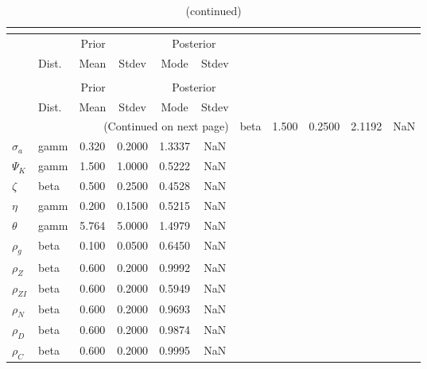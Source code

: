  
\begin{center}
\begin{longtable}{llcccc} 
\caption{Results from posterior maximization (parameters)}\\
 \label{Table:Posterior:1}\\
\toprule 
  & \multicolumn{3}{c}{Prior}  &  \multicolumn{2}{c}{Posterior} \\
  \cmidrule(r{.75em}){2-4} \cmidrule(r{.75em}){5-6}
  & Dist. & Mean  & Stdev & Mode & Stdev \\ 
\midrule \endfirsthead 
\caption{(continued)}\\
 \bottomrule 
  & \multicolumn{3}{c}{Prior}  &  \multicolumn{2}{c}{Posterior} \\
  \cmidrule(r{.75em}){2-4} \cmidrule(r{.75em}){5-6}
  & Dist. & Mean  & Stdev & Mode & Stdev \\ 
\midrule \endhead 
\bottomrule \multicolumn{6}{r}{(Continued on next page)}\endfoot 
\bottomrule\endlastfoot 
${\gamma}$ & beta &   1.500 & 0.2500 &   2.1192 &     NaN \\ 
${\sigma_a}$ & gamm &   0.320 & 0.2000 &   1.3337 &     NaN \\ 
${\Psi_K}$ & gamm &   1.500 & 1.0000 &   0.5222 &     NaN \\ 
${\zeta}$ & beta &   0.500 & 0.2500 &   0.4528 &     NaN \\ 
${\eta}$ & gamm &   0.200 & 0.1500 &   0.5215 &     NaN \\ 
${\theta}$ & gamm &   5.764 & 5.0000 &   1.4979 &     NaN \\ 
${\rho_g}$ & beta &   0.100 & 0.0500 &   0.6450 &     NaN \\ 
${\rho_Z}$ & beta &   0.600 & 0.2000 &   0.9992 &     NaN \\ 
${\rho_{ZI}}$ & beta &   0.600 & 0.2000 &   0.5949 &     NaN \\ 
${\rho_N}$ & beta &   0.600 & 0.2000 &   0.9693 &     NaN \\ 
${\rho_D}$ & beta &   0.600 & 0.2000 &   0.9874 &     NaN \\ 
${\rho_C}$ & beta &   0.600 & 0.2000 &   0.9995 &     NaN \\ 
\end{longtable}
 \end{center}

